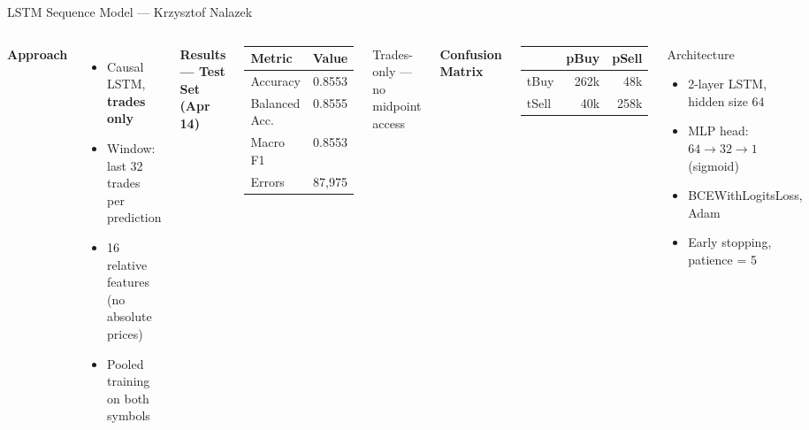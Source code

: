 \documentclass[aspectratio=169,10pt]{beamer}
\begin{document}
\begin{frame}{LSTM Sequence Model — Krzysztof Nalazek}
  \begin{columns}[T]
    \textbf{Approach}
    \begin{itemize}
      \item Causal LSTM, \textbf{trades only}
      \item Window: last 32 trades per prediction
      \item 16 relative features (no absolute prices)
      \item Pooled training on both symbols
    \end{itemize}

    \medskip
    \textbf{Results — Test Set (Apr 14)}
    \begin{center}
    \begin{tabular}{lc}
      \toprule
      Metric & Value \\
      \midrule
      Accuracy       & 0.8553 \\
      Balanced Acc.\ & 0.8555 \\
      Macro F1       & 0.8553 \\
      Errors         & 87{,}975 \\
      \bottomrule
    \end{tabular}
    \end{center}
    \smallskip
    {\small\textcolor{badred}{Trades-only — no midpoint access}}

    \textbf{Confusion Matrix}
    \begin{center}
    \begin{tabular}{lrr}
      \toprule
       & pBuy & pSell \\
      \midrule
      tBuy  & 262k & 48k \\
      tSell & 40k  & 258k \\
      \bottomrule
    \end{tabular}
    \end{center}

    \medskip
    \begin{block}{Architecture}
      \begin{itemize}
        \item 2-layer LSTM, hidden size 64
        \item MLP head: $64 \to 32 \to 1$ (sigmoid)
        \item BCEWithLogitsLoss, Adam
        \item Early stopping, patience = 5
      \end{itemize}
    \end{block}
  \end{columns}
\end{frame}
\end{document}
